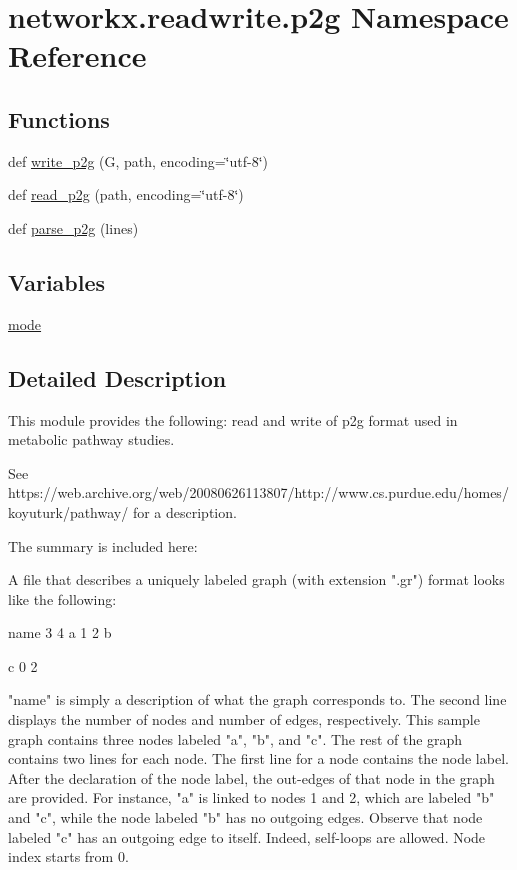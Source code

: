 \hypertarget{namespacenetworkx_1_1readwrite_1_1p2g}{}\section{networkx.\+readwrite.\+p2g Namespace Reference}
\label{namespacenetworkx_1_1readwrite_1_1p2g}
\subsection*{Functions}
\begin{DoxyCompactItemize}
\item 
def \hyperlink{namespacenetworkx_1_1readwrite_1_1p2g_adb94867390c6490add27ac393aece7a2}{write\+\_\+p2g} (G, path, encoding=\char`\"{}utf-\/8\char`\"{})
\item 
def \hyperlink{namespacenetworkx_1_1readwrite_1_1p2g_aa7b2cdffc6bc84649b43cd4b9945d4e9}{read\+\_\+p2g} (path, encoding=\char`\"{}utf-\/8\char`\"{})
\item 
def \hyperlink{namespacenetworkx_1_1readwrite_1_1p2g_aeaae5630a70e06903b697c48467c194c}{parse\+\_\+p2g} (lines)
\end{DoxyCompactItemize}
\subsection*{Variables}
\begin{DoxyCompactItemize}
\item 
\hyperlink{namespacenetworkx_1_1readwrite_1_1p2g_afe5b4706a0fa57001ebb88764be24d83}{mode}
\end{DoxyCompactItemize}


\subsection{Detailed Description}
\begin{DoxyVerb}This module provides the following: read and write of p2g format
used in metabolic pathway studies.

See https://web.archive.org/web/20080626113807/http://www.cs.purdue.edu/homes/koyuturk/pathway/ for a description.

The summary is included here:

A file that describes a uniquely labeled graph (with extension ".gr")
format looks like the following:


name
3 4
a
1 2
b

c
0 2

"name" is simply a description of what the graph corresponds to. The
second line displays the number of nodes and number of edges,
respectively. This sample graph contains three nodes labeled "a", "b",
and "c". The rest of the graph contains two lines for each node. The
first line for a node contains the node label. After the declaration
of the node label, the out-edges of that node in the graph are
provided. For instance, "a" is linked to nodes 1 and 2, which are
labeled "b" and "c", while the node labeled "b" has no outgoing
edges. Observe that node labeled "c" has an outgoing edge to
itself. Indeed, self-loops are allowed. Node index starts from 0.\end{DoxyVerb}
 


